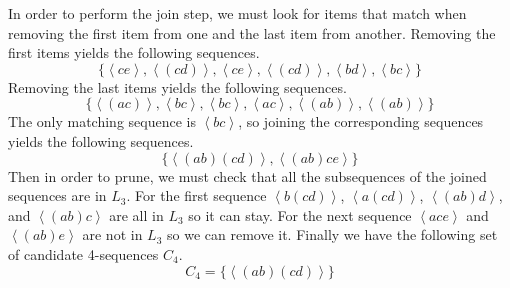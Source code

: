 \documentclass[12pt]{article}
\begin{document}
In order to perform the join step, we must look for items that match when removing the first item from one
and the last item from another. Removing the first items yields the following sequences.
\[\{\left<ce\right>,\left<(cd)\right>,\left<ce\right>,\left<(cd)\right>,\left<bd\right>,\left<bc\right>\}\]
Removing the last items yields the following sequences.
\[\{\left<(ac)\right>,\left<bc\right>,\left<bc\right>,\left<ac\right>,\left<(ab)\right>,\left<(ab)\right>\}\]
The only matching sequence is \(\left<bc\right>\), so joining the corresponding sequences yields the following
sequences.
\[\{\left<(ab)(cd)\right>,\left<(ab)ce\right>\}\]
Then in order to prune, we must check that all the subsequences of the joined sequences are in \(L_3\). For
the first sequence \(\left<b(cd)\right>\), \(\left<a(cd)\right>\), \(\left<(ab)d\right>\), and \(\left<(ab)c\right>\)
are all in \(L_3\) so it can stay. For the next sequence \(\left<ace\right>\) and \(\left<(ab)e\right>\) are not
in \(L_3\) so we can remove it. Finally we have the following set of candidate 4-sequences \(C_4\).
\[C_4=\{\left<(ab)(cd)\right>\}\]
\end{document}

